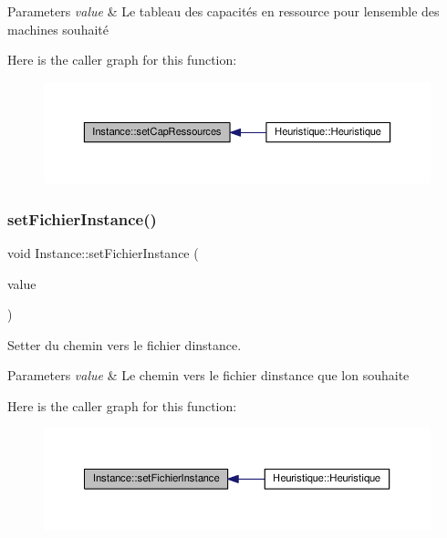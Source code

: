 \begin{DoxyParams}{Parameters}
{\em value} & Le tableau des capacités en ressource pour l\textquotesingle{}ensemble des machines souhaité \\
\hline
\end{DoxyParams}
Here is the caller graph for this function\+:\nopagebreak
\begin{figure}[H]
\begin{center}
\leavevmode
\includegraphics[width=350pt]{classInstance_a57f113b9723182ba7f8f5346b34095eb_icgraph}
\end{center}
\end{figure}
\mbox{\label{classInstance_a263461a7a8c44c9e7080620a30cc8fcf}} 
\subsubsection{\texorpdfstring{set\+Fichier\+Instance()}{setFichierInstance()}}
{\footnotesize\ttfamily void Instance\+::set\+Fichier\+Instance (\begin{DoxyParamCaption}\item[{const Q\+String \&}]{value }\end{DoxyParamCaption})}



Setter du chemin vers le fichier d\textquotesingle{}instance. 


\begin{DoxyParams}{Parameters}
{\em value} & Le chemin vers le fichier d\textquotesingle{}instance que l\textquotesingle{}on souhaite \\
\hline
\end{DoxyParams}
Here is the caller graph for this function\+:\nopagebreak
\begin{figure}[H]
\begin{center}
\leavevmode
\includegraphics[width=350pt]{classInstance_a263461a7a8c44c9e7080620a30cc8fcf_icgraph}
\end{center}
\end{figure}
\mbox{\label{classInstance_a3d954198f1caa44f89a61262c14fc716}} 
